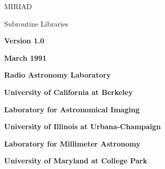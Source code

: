 %
\phantom{MIRIAD}

\nopagenumbers
\vskip 0.5in \centerline{\biggest MIRIAD}
\vskip 0.5in \centerline{\biggest Subroutine Libraries}
\vskip 1.0in \centerline{\bf Version 1.0}
\vskip 0.25in\centerline{\bf March 1991}
\vfill

\centerline{\bf Radio Astronomy Laboratory}
\centerline{\bf University of California at Berkeley}
\vskip 0.25in
\centerline{\bf Laboratory for Astronomical Imaging}
\centerline{\bf University of Illinois at Urbana-Champaign}
\vskip 0.25in
\centerline{\bf Laboratory for Millimeter Astronomy}
\centerline{\bf University of Maryland at College Park}
\vskip 0.25in
\eject

